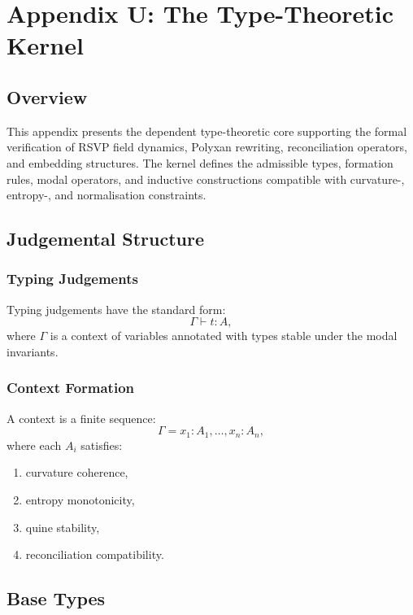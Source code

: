 \chapter*{Appendix U: The Type-Theoretic Kernel}

\section{Overview}

This appendix presents the dependent type-theoretic core supporting the formal verification of RSVP field dynamics, Polyxan rewriting, reconciliation operators, and embedding structures. The kernel defines the admissible types, formation rules, modal operators, and inductive constructions compatible with curvature-, entropy-, and normalisation constraints.

\section{Judgemental Structure}

\subsection{Typing Judgements}

Typing judgements have the standard form:
\[
\Gamma \vdash t : A,
\]
where $\Gamma$ is a context of variables annotated with types stable under the modal invariants.

\subsection{Context Formation}

A context is a finite sequence:
\[
\Gamma = x_1 : A_1, \ldots, x_n : A_n,
\]
where each $A_i$ satisfies:
\begin{enumerate}
\item curvature coherence,
\item entropy monotonicity,
\item quine stability,
\item reconciliation compatibility.
\end{enumerate}

\section{Base Types}

